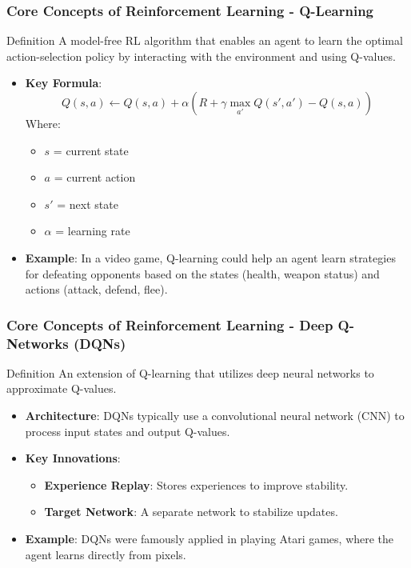 \documentclass[aspectratio=169]{beamer}
\begin{document}
\begin{frame}[fragile]
    \frametitle{Core Concepts of Reinforcement Learning - Q-Learning}
    \begin{block}{Definition}
        A model-free RL algorithm that enables an agent to learn the optimal action-selection policy by interacting with the environment and using Q-values.
    \end{block}
    \begin{itemize}
        \item \textbf{Key Formula}:
        \begin{equation}
            Q(s, a) \leftarrow Q(s, a) + \alpha \left( R + \gamma \max_{a'} Q(s', a') - Q(s, a) \right)
        \end{equation}
        Where:
        \begin{itemize}
            \item $s$ = current state
            \item $a$ = current action
            \item $s'$ = next state
            \item $\alpha$ = learning rate
        \end{itemize}
        \item \textbf{Example}: In a video game, Q-learning could help an agent learn strategies for defeating opponents based on the states (health, weapon status) and actions (attack, defend, flee).
    \end{itemize}
\end{frame}

\begin{frame}[fragile]
    \frametitle{Core Concepts of Reinforcement Learning - Deep Q-Networks (DQNs)}
    \begin{block}{Definition}
        An extension of Q-learning that utilizes deep neural networks to approximate Q-values.
    \end{block}
    \begin{itemize}
        \item \textbf{Architecture}: DQNs typically use a convolutional neural network (CNN) to process input states and output Q-values.
        \item \textbf{Key Innovations}:
        \begin{itemize}
            \item \textbf{Experience Replay}: Stores experiences to improve stability.
            \item \textbf{Target Network}: A separate network to stabilize updates.
        \end{itemize}
        \item \textbf{Example}: DQNs were famously applied in playing Atari games, where the agent learns directly from pixels.
    \end{itemize}
\end{frame}
\end{document}
